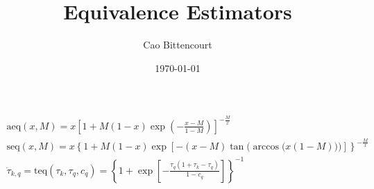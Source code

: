 \documentclass{article}
\title{Equivalence Estimators}
\author{Cao Bittencourt}
\date{\today}
\begin{document}
    \begin{gather}
        \text{aeq}(x,M) = x \left[
            1 + M(1-x)\exp\left(
                -\frac{x-M}{1-M}
            \right)
        \right] ^ {-\frac{M}{x}}\\
        \text{seq}(x,M) = x \left\{ 
            1 + M(1-x)\exp\left[
                -(x-M)
                \tan\bigg(
                    \arccos\big(
                        x(1-M)
                    \big)
                \bigg)
            \right]
        \right\} ^ {-\frac{M}{x}}\\
        \ddot{\tau}_{k,q} = 
        \text{teq}(\tau_{k}, \tau_{q}, c_{q}) = 
        \left\{
            1 + \exp[-
                \frac{
                    \tau_{q}
                    (1 + \tau_{k} - \tau_{q})
                }{
                    1 - c_{q}
                }
            ]
        \right\} ^ {-1}
    \end{gather}
\end{document}

